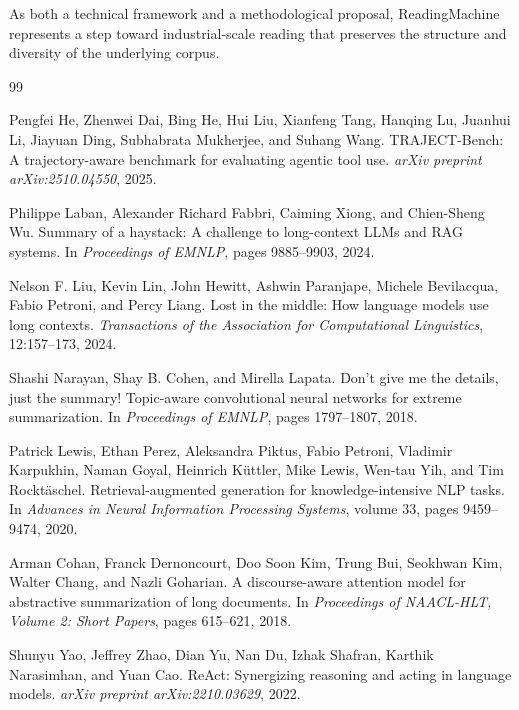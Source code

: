 \documentclass[
  11pt,
]{article}
\begin{document}
As both a technical framework and a methodological proposal,
ReadingMachine represents a step toward industrial-scale reading that
preserves the structure and diversity of the underlying corpus.

\begin{thebibliography}{99}

Pengfei He, Zhenwei Dai, Bing He, Hui Liu, Xianfeng Tang, Hanqing Lu, Juanhui Li, Jiayuan Ding, Subhabrata Mukherjee, and Suhang Wang.
\newblock TRAJECT-Bench: A trajectory-aware benchmark for evaluating agentic tool use.
\newblock \emph{arXiv preprint arXiv:2510.04550}, 2025.

Philippe Laban, Alexander Richard Fabbri, Caiming Xiong, and Chien-Sheng Wu.
\newblock Summary of a haystack: A challenge to long-context LLMs and RAG systems.
\newblock In \emph{Proceedings of EMNLP}, pages 9885--9903, 2024.

Nelson F. Liu, Kevin Lin, John Hewitt, Ashwin Paranjape, Michele Bevilacqua, Fabio Petroni, and Percy Liang.
\newblock Lost in the middle: How language models use long contexts.
\newblock \emph{Transactions of the Association for Computational Linguistics}, 12:157--173, 2024.

Shashi Narayan, Shay B. Cohen, and Mirella Lapata.
\newblock Don't give me the details, just the summary! Topic-aware convolutional neural networks for extreme summarization.
\newblock In \emph{Proceedings of EMNLP}, pages 1797--1807, 2018.

Patrick Lewis, Ethan Perez, Aleksandra Piktus, Fabio Petroni, Vladimir Karpukhin, Naman Goyal, Heinrich K{\"u}ttler, Mike Lewis, Wen-tau Yih, and Tim Rockt{\"a}schel.
\newblock Retrieval-augmented generation for knowledge-intensive NLP tasks.
\newblock In \emph{Advances in Neural Information Processing Systems}, volume 33, pages 9459--9474, 2020.

Arman Cohan, Franck Dernoncourt, Doo Soon Kim, Trung Bui, Seokhwan Kim, Walter Chang, and Nazli Goharian.
\newblock A discourse-aware attention model for abstractive summarization of long documents.
\newblock In \emph{Proceedings of NAACL-HLT, Volume 2: Short Papers}, pages 615--621, 2018.

Shunyu Yao, Jeffrey Zhao, Dian Yu, Nan Du, Izhak Shafran, Karthik Narasimhan, and Yuan Cao.
\newblock ReAct: Synergizing reasoning and acting in language models.
\newblock \emph{arXiv preprint arXiv:2210.03629}, 2022.


\end{thebibliography}
\end{document}

